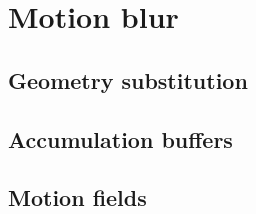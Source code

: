 \chapter{Motion blur}

\section{Geometry substitution}

\section{Accumulation buffers}

\section{Motion fields}